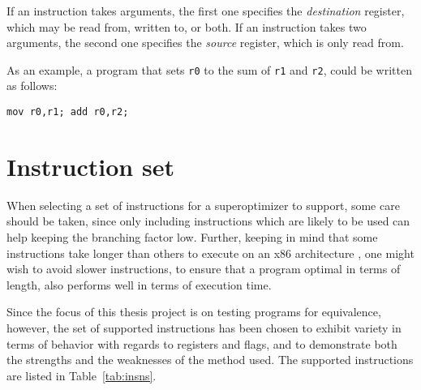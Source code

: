 \documentclass[a4paper,11pt]{kth-mag}
\begin{document}
If an instruction takes arguments, the first one specifies the \emph{destination} register, which may be read from, written to, or both.
If an instruction takes two arguments, the second one specifies the \emph{source} register, which is only read from.

As an example, a program that sets \verb|r0| to the sum of \verb|r1| and \verb|r2|, could be written as follows:

\begin{verbatim}
mov r0,r1; add r0,r2;
\end{verbatim}

\section{Instruction set}

When selecting a set of instructions for a superoptimizer to support, some care should be taken, since only including instructions which are likely to be used can help keeping the branching factor low.
Further, keeping in mind that some instructions take longer than others to execute on an x86 architecture \cite{x86_timing}, one might wish to avoid slower instructions, to ensure that a program optimal in terms of length, also performs well in terms of execution time.

Since the focus of this thesis project is on testing programs for equivalence, however, the set of supported instructions has been chosen to exhibit variety in terms of behavior with regards to registers and flags, and to demonstrate both the strengths and the weaknesses of the method used. The supported instructions are listed in Table~\ref{tab:insns}.
\end{document}
